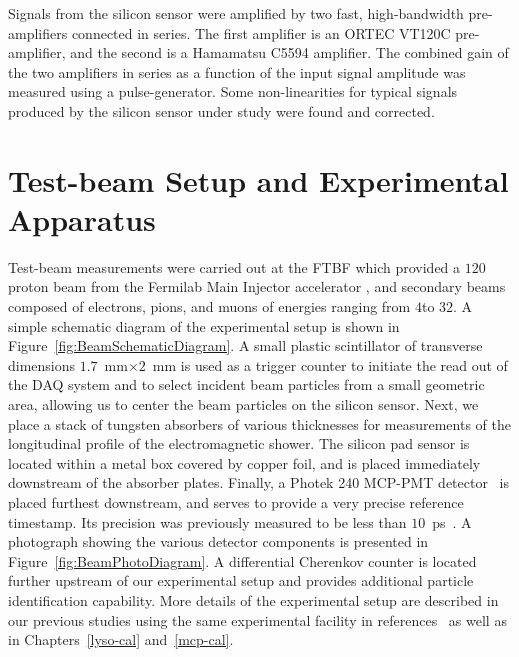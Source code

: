 Signals from the silicon sensor were amplified by two fast, high-bandwidth
pre-amplifiers connected in series. The first amplifier is an ORTEC VT120C
pre-amplifier, and the second is a Hamamatsu C5594 amplifier. The 
combined gain of the two amplifiers in series
as a function of the input signal amplitude was measured using a
pulse-generator. Some
non-linearities for typical signals produced by the silicon sensor
under study were found and corrected.


\section{Test-beam Setup and Experimental Apparatus }
\label{sec:tbeam}
Test-beam measurements were carried out at the FTBF which provided a $120$\GeV proton beam from the Fermilab Main Injector accelerator
, and secondary beams composed of electrons, pions, and muons of
energies ranging from $4$\GeV to $32$\GeV. A simple schematic diagram of the
experimental setup is shown in Figure~\ref{fig:BeamSchematicDiagram}. A small
plastic scintillator of transverse dimensions $1.7$~mm$\times 2$~mm is used as a
trigger counter to initiate the read out of the DAQ system
and to select incident beam particles from a small geometric area, allowing us to center the 
beam particles on the silicon sensor. Next, we place a stack of tungsten absorbers of various thicknesses for
measurements of the longitudinal profile of the electromagnetic shower. The
silicon pad sensor is located within a metal box covered by copper foil, and is
placed immediately downstream of the absorber plates. Finally, a Photek 240
MCP-PMT detector~\cite{Anderson:2015gha,
MCPFastCaloNIMA, Ronzhin2015288,Ronzhin201552} is placed furthest downstream,
and serves to provide a very precise reference timestamp. Its precision was
previously measured to be less than $10$~ps~\cite{Ronzhin2015288}. 
A photograph showing the various
detector components is presented in Figure~\ref{fig:BeamPhotoDiagram}. A
differential Cherenkov counter is located further upstream of our experimental
setup and provides additional particle identification capability. More
details of the experimental setup are described in our previous studies using
the same experimental facility in references~\cite{Anderson:2015gha,
MCPFastCaloNIMA, Ronzhin2015288,Ronzhin201552} as well as in Chapters~\ref{lyso-cal} and~\ref{mcp-cal}.

